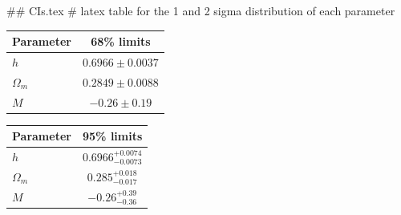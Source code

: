 ## CIs.tex
# latex table for the 1 and 2 sigma distribution of each parameter

\begin{tabular} { l  c}
 Parameter &  68\% limits\\
\hline
{\boldmath$h              $} & $0.6966\pm 0.0037          $\\
{\boldmath$\Omega_m       $} & $0.2849\pm 0.0088          $\\
{\boldmath$M              $} & $-0.26\pm 0.19             $\\
\hline
\end{tabular}

\begin{tabular} { l  c}
 Parameter &  95\% limits\\
\hline
{\boldmath$h              $} & $0.6966^{+0.0074}_{-0.0073}$\\
{\boldmath$\Omega_m       $} & $0.285^{+0.018}_{-0.017}   $\\
{\boldmath$M              $} & $-0.26^{+0.39}_{-0.36}     $\\
\hline
\end{tabular}
